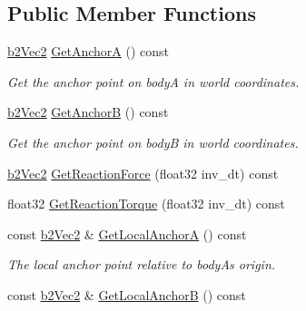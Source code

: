 \subsection*{Public Member Functions}
\begin{DoxyCompactItemize}
\item 
\mbox{\label{classb2DistanceJoint_ab3551807ecc5582a12ac7d99cb4e5ac8}} 
\hyperlink{structb2Vec2}{b2\+Vec2} \hyperlink{classb2DistanceJoint_ab3551807ecc5582a12ac7d99cb4e5ac8}{Get\+AnchorA} () const
\begin{DoxyCompactList}\small\item\em Get the anchor point on bodyA in world coordinates. \end{DoxyCompactList}\item 
\mbox{\label{classb2DistanceJoint_abaf96d12914a797fd439e5f7f232f5b4}} 
\hyperlink{structb2Vec2}{b2\+Vec2} \hyperlink{classb2DistanceJoint_abaf96d12914a797fd439e5f7f232f5b4}{Get\+AnchorB} () const
\begin{DoxyCompactList}\small\item\em Get the anchor point on bodyB in world coordinates. \end{DoxyCompactList}\item 
\hyperlink{structb2Vec2}{b2\+Vec2} \hyperlink{classb2DistanceJoint_ae396ea13a9df2c47a267151c67b3d4fe}{Get\+Reaction\+Force} (float32 inv\+\_\+dt) const
\item 
float32 \hyperlink{classb2DistanceJoint_ab62694b1ed44d3d66f19c42be94068ad}{Get\+Reaction\+Torque} (float32 inv\+\_\+dt) const
\item 
\mbox{\label{classb2DistanceJoint_aaa881128071c62f21898a75d5b20308a}} 
const \hyperlink{structb2Vec2}{b2\+Vec2} \& \hyperlink{classb2DistanceJoint_aaa881128071c62f21898a75d5b20308a}{Get\+Local\+AnchorA} () const
\begin{DoxyCompactList}\small\item\em The local anchor point relative to bodyA\textquotesingle{}s origin. \end{DoxyCompactList}\item 
\mbox{\label{classb2DistanceJoint_a214a1cca8854613d7401c9a5892a28c9}} 
const \hyperlink{structb2Vec2}{b2\+Vec2} \& \hyperlink{classb2DistanceJoint_a214a1cca8854613d7401c9a5892a28c9}{Get\+Local\+AnchorB} () const

\end{DoxyCompactItemize}
